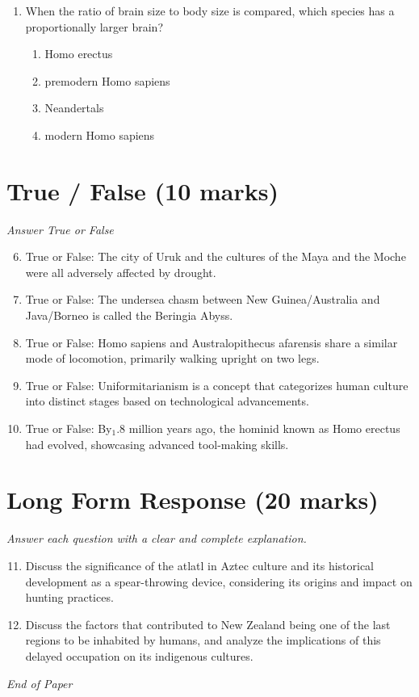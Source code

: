 \documentclass[12pt]{article}
\begin{document}
\begin{enumerate}[label=\arabic*.]
\begin{enumerate}[label=(\alph*)]
    \item sacrificing children in order to propitiate the spirits of the mountains
\end{enumerate}
\item When the ratio of brain size to body size is compared, which species has a proportionally larger brain?
\begin{enumerate}[label=(\alph*)]
    \item Homo erectus
    \item premodern Homo sapiens
    \item Neandertals
    \item modern Homo sapiens
\end{enumerate}
\end{enumerate}

\section*{True / False (10 marks)}
\textit{Answer True or False}
\begin{enumerate}[label=\arabic*.]
\setcounter{enumi}{5}
\item True or False: The city of Uruk and the cultures of the Maya and the Moche were all adversely affected by drought.
\item True or False: The undersea chasm between New Guinea/Australia and Java/Borneo is called the Beringia Abyss.
\item True or False: Homo sapiens and Australopithecus afarensis share a similar mode of locomotion, primarily walking upright on two legs.
\item True or False: Uniformitarianism is a concept that categorizes human culture into distinct stages based on technological advancements.
\item True or False: By$_{1}$.8 million years ago, the hominid known as Homo erectus had evolved, showcasing advanced tool-making skills.
\end{enumerate}

\section*{Long Form Response (20 marks)}
\textit{Answer each question with a clear and complete explanation.}
\begin{enumerate}[label=\arabic*.]
\setcounter{enumi}{10}
\item Discuss the significance of the atlatl in Aztec culture and its historical development as a spear-throwing device, considering its origins and impact on hunting practices.
\item Discuss the factors that contributed to New Zealand being one of the last regions to be inhabited by humans, and analyze the implications of this delayed occupation on its indigenous cultures.
\end{enumerate}

\vfill
\noindent\textit{End of Paper}
\end{document}
